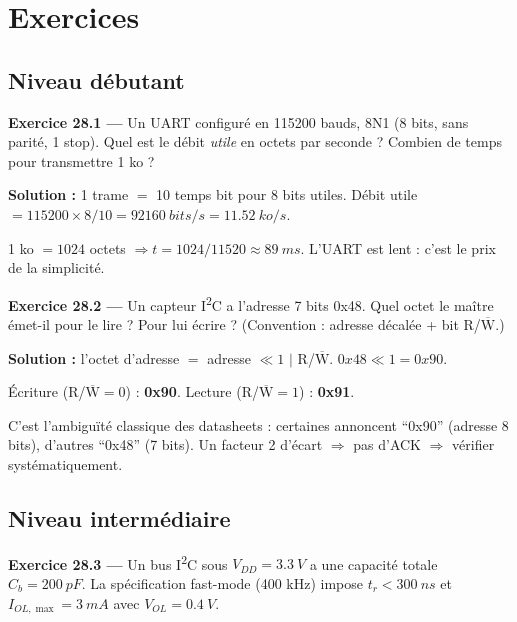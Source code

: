 \documentclass[12pt,a4paper,twoside]{book}
\begin{document}
\section*{Exercices}

\subsection*{Niveau débutant}

\textbf{Exercice 28.1 ---} Un UART configuré en 115200 bauds, 8N1 (8 bits, sans parité, 1 stop). Quel est le débit \textit{utile} en octets par seconde ? Combien de temps pour transmettre 1 ko ?

\begin{pratique}
\textbf{Solution :} 1 trame $=$ 10 temps bit pour 8 bits utiles. Débit utile $= 115200 \times 8/10 = \SI{92160}{bits/s} = \SI{11.52}{ko/s}$.

1 ko $= 1024$ octets $\Rightarrow t = 1024/11520 \approx \SI{89}{ms}$. L'UART est lent : c'est le prix de la simplicité.
\end{pratique}

\textbf{Exercice 28.2 ---} Un capteur I\textsuperscript{2}C a l'adresse 7 bits 0x48. Quel octet le maître émet-il pour le lire ? Pour lui écrire ? (Convention : adresse décalée + bit R/$\overline{\text{W}}$.)

\begin{pratique}
\textbf{Solution :} l'octet d'adresse $=$ adresse $\ll 1$ $|$ R/$\overline{\text{W}}$. $0x48 \ll 1 = 0x90$.

Écriture (R/$\overline{\text{W}} = 0$) : \textbf{0x90}. Lecture (R/$\overline{\text{W}} = 1$) : \textbf{0x91}.

C'est l'ambiguïté classique des datasheets : certaines annoncent ``0x90'' (adresse 8 bits), d'autres ``0x48'' (7 bits). Un facteur 2 d'écart $\Rightarrow$ pas d'ACK $\Rightarrow$ vérifier systématiquement.
\end{pratique}

\subsection*{Niveau intermédiaire}

\textbf{Exercice 28.3 ---} Un bus I\textsuperscript{2}C sous $V_{DD} = \SI{3.3}{V}$ a une capacité totale $C_b = \SI{200}{pF}$. La spécification fast-mode (400 kHz) impose $t_r < \SI{300}{ns}$ et $I_{OL,\max} = \SI{3}{mA}$ avec $V_{OL} = \SI{0.4}{V}$.
\end{document}
